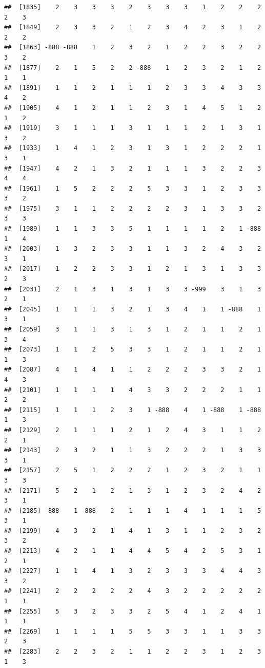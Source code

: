 \documentclass[
  12pt,
  openany]{book}
\begin{document}
\begin{verbatim}
##  [1835]    2    3    3    3    2    3    3    3    1    2    2    2    2    3
##  [1849]    2    3    3    2    1    2    3    4    2    3    1    2    2    2
##  [1863] -888 -888    1    2    3    2    1    2    2    3    2    2    3    2
##  [1877]    2    1    5    2    2 -888    1    2    3    2    1    2    1    1
##  [1891]    1    1    2    1    1    1    2    3    3    4    3    3    4    2
##  [1905]    4    1    2    1    1    2    3    1    4    5    1    2    1    2
##  [1919]    3    1    1    1    3    1    1    1    2    1    3    1    3    2
##  [1933]    1    4    1    2    3    1    3    1    2    2    2    1    3    1
##  [1947]    4    2    1    3    2    1    1    1    3    2    2    3    4    4
##  [1961]    1    5    2    2    2    5    3    3    1    2    3    3    3    2
##  [1975]    3    1    1    2    2    2    2    3    1    3    3    2    3    3
##  [1989]    1    1    3    3    5    1    1    1    1    2    1 -888    1    4
##  [2003]    1    3    2    3    3    1    1    3    2    4    3    2    3    1
##  [2017]    1    2    2    3    3    1    2    1    3    1    3    3    2    3
##  [2031]    2    1    3    1    3    1    3    3 -999    3    1    3    2    1
##  [2045]    1    1    1    3    2    1    3    4    1    1 -888    1    3    1
##  [2059]    3    1    1    3    1    3    1    2    1    1    2    1    3    4
##  [2073]    1    1    2    5    3    3    1    2    1    1    2    1    1    3
##  [2087]    4    1    4    1    1    2    2    2    3    3    2    1    4    3
##  [2101]    1    1    1    1    4    3    3    2    2    2    1    1    2    2
##  [2115]    1    1    1    2    3    1 -888    4    1 -888    1 -888    1    3
##  [2129]    2    1    1    1    2    1    2    4    3    1    1    2    2    1
##  [2143]    2    3    2    1    1    3    2    2    2    1    3    3    3    1
##  [2157]    2    5    1    2    2    2    1    2    3    2    1    1    3    3
##  [2171]    5    2    1    2    1    3    1    2    3    2    4    2    3    1
##  [2185] -888    1 -888    2    1    1    1    4    1    1    1    5    3    1
##  [2199]    4    3    2    1    4    1    3    1    1    2    3    2    3    2
##  [2213]    4    2    1    1    4    4    5    4    2    5    3    1    2    1
##  [2227]    1    1    4    1    3    2    3    3    3    4    4    3    3    2
##  [2241]    2    2    2    2    2    4    3    2    2    2    2    2    1    1
##  [2255]    5    3    2    3    3    2    5    4    1    2    4    1    1    1
##  [2269]    1    1    1    1    5    5    3    3    1    1    3    3    2    3
##  [2283]    2    2    3    2    1    1    2    2    3    1    2    3    1    3

\end{verbatim}
\end{document}
